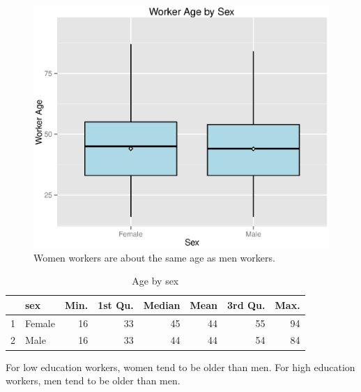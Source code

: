 \documentclass{exam}
\begin{document}
  \begin{figure}[H]
    \centering
    \includegraphics{figures/wa_age_by_sex.eps}
    \caption{Women workers are about the same age as men workers.}
  \end{figure}

  \begin{table}[ht]
    \centering
    \begin{tabular}{rlrrrrrr}
      \toprule
        & sex    & Min. & 1st Qu. & Median & Mean & 3rd Qu. & Max. \\
      \midrule
      1 & Female & 16   & 33      & 45     & 44   & 55      & 94 \\
      2 & Male   & 16   & 33      & 44     & 44   & 54      & 84 \\
      \bottomrule
    \end{tabular}
    \caption{Age by sex}
  \end{table}

  For low education workers, women tend to be older than men.  For high education workers, men
  tend to be older than men.  
\end{document}
